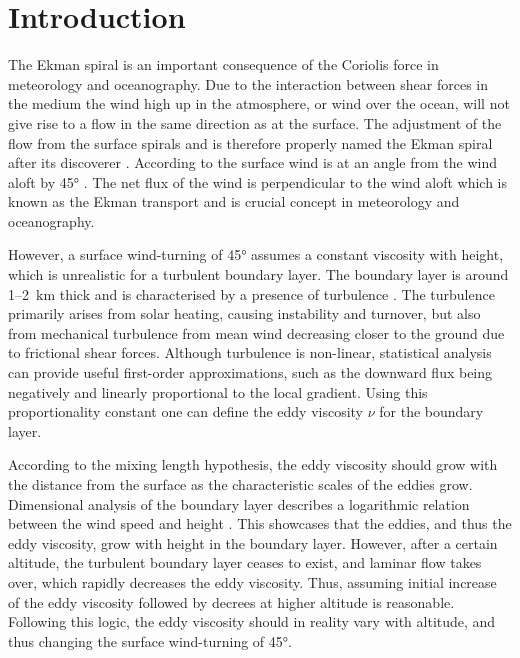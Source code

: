 \section{Introduction}
The Ekman spiral is an important consequence of the Coriolis force in meteorology and oceanography. Due to the interaction between shear forces in the medium the wind high up in the atmosphere, or wind over the ocean, will not give rise to a flow in the same direction as at the surface. The adjustment of the flow from the surface spirals and is therefore properly named the Ekman spiral after its discoverer \citet{ekman1905}. According to \citet{ekman1905} the surface wind is at an angle from the wind aloft by \ang{45} \citep{ekman1905}. The net flux of the wind is perpendicular to the wind aloft which is known as the Ekman transport and is crucial concept in meteorology and oceanography.

However, a surface wind-turning of \ang{45} assumes a constant viscosity with height, which is unrealistic for a turbulent boundary layer. The boundary layer is around \SI{1}{}--\SI{2}{\kilo\meter} thick and is characterised by a presence of turbulence \citep{wallace2006}. The turbulence primarily arises from solar heating, causing instability and turnover, but also from mechanical turbulence from mean wind decreasing closer to the ground due to frictional shear forces. Although turbulence is non-linear, statistical analysis can provide useful first-order approximations, such as the downward flux being negatively and linearly proportional to the local gradient. Using this proportionality constant one can define the eddy viscosity $\nu$ for the boundary layer.

According to the mixing length hypothesis, the eddy viscosity should grow with the distance from the surface as the characteristic scales of the eddies grow. Dimensional analysis of the boundary layer describes a logarithmic relation between the wind speed and height  \citep{wallace2006}. This showcases that the eddies, and thus the eddy viscosity, grow with height in the boundary layer. However, after a certain altitude, the turbulent boundary layer ceases to exist, and laminar flow takes over, which rapidly decreases the eddy viscosity. Thus, assuming initial increase of the eddy viscosity followed by decrees at higher altitude is reasonable. Following this logic, the eddy viscosity should in reality vary with altitude, and thus changing the surface wind-turning of \ang{45}. 

